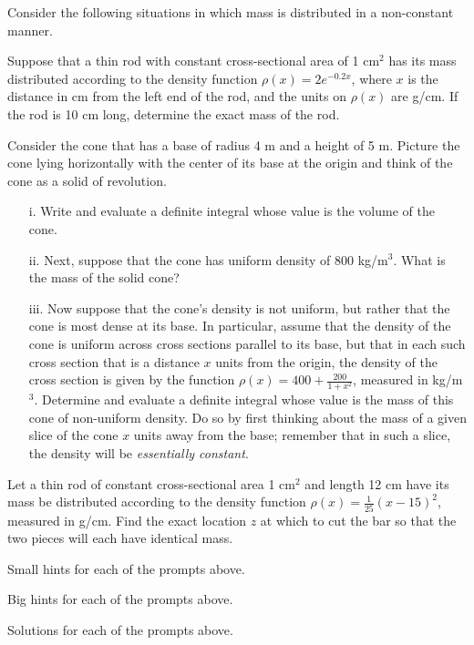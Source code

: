 \begin{activity} \label{A:6.4.1}  Consider the following situations in which mass is distributed in a non-constant manner.
\ba
	\item Suppose that a thin rod with constant cross-sectional area of 1 cm$^2$ has its mass distributed according to the density function $\rho(x) = 2e^{-0.2x}$, where $x$ is the distance in cm from the left end of the rod, and the units on $\rho(x)$ are g/cm.  If the rod is 10 cm long, determine the exact mass of the rod.
	
	\item Consider the cone that has a base of radius 4 m and a height of 5 m.  Picture the cone lying horizontally with the center of its base at the origin and think of the cone as a solid of revolution.  
	\begin{itemize}
		\item[i.]  Write and evaluate a definite integral whose value is the volume of the cone.

		\item[ii.]  Next, suppose that the cone has uniform density of 800 kg/m$^3$.  What is the mass of the solid cone?

		\item[iii.] Now suppose that the cone's density is not uniform, but rather that the cone is most dense at its base.  In particular, assume that the density of the cone is uniform across cross sections parallel to its base, but that in each such cross section that is a distance $x$ units from the origin, the density of the cross section is given by the function $\rho(x) = 400 + \frac{200}{1+x^2}$, measured in kg/m$^3$.  Determine and evaluate a definite integral whose value is the mass of this cone of non-uniform density.  Do so by first thinking about the mass of a given slice of the cone $x$ units away from the base; remember that in such a slice, the density will be \emph{essentially constant}.
	\end{itemize}

	\item Let a thin rod of constant cross-sectional area 1 cm$^2$ and length 12 cm have its mass be distributed according to the density function $\rho(x) = \frac{1}{25}(x-15)^2$, measured in g/cm.  Find the exact location $z$ at which to cut the bar so that the two pieces will each have identical mass.

\ea

\end{activity}
\begin{smallhint}
\ba
	\item Small hints for each of the prompts above.
\ea
\end{smallhint}
\begin{bighint}
\ba
	\item Big hints for each of the prompts above.
\ea
\end{bighint}
\begin{activitySolution}
\ba
	\item Solutions for each of the prompts above.
\ea
\end{activitySolution}
\aftera